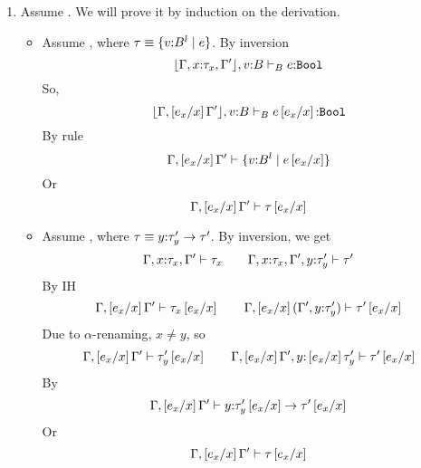 \begin{enumerate}
\item \label{proof:sub:wf}
Assume .
We will prove it by induction on the derivation.
\begin{itemize}
\item \rwbase
Assume ,
where $\tau\equiv\tref{v}{B}{l}{e}$.
By inversion
$$\hastypebase{\erase{\Gamma, x\colon\tau_x, \Gamma'},v\colon B}{e}{\tbool}$$
So,
$$\hastypebase{\erase{\Gamma, \sub{x}{e_x}\Gamma'},v\colon B}{e\sub{x}{e_x}}{\tbool}$$
By rule \rwbase
$$\iswellformed{\Gamma, \sub{x}{e_x}\Gamma'}{\tref{v}{B}{l}{e\sub{x}{e_x}}}$$
Or 
$$\iswellformed{\Gamma, \sub{x}{e_x}\Gamma'}{\tau\sub{x}{e_x}}$$
\item \rwfun
Assume ,
where $\tau\equiv \tfun{y}{\tau'_y}{\tau'}$.
By inversion, we get
$$
	\iswellformed{\Gamma, x\colon\tau_x, \Gamma'}{\tau_x} \qquad
	\iswellformed{\Gamma, x\colon\tau_x, \Gamma', y \colon \tau'_y}{\tau'}
$$
By IH
$$
	\iswellformed{\Gamma, \sub{x}{e_x} \Gamma'}{\tau_x\sub{x}{e_x}}\qquad
	\iswellformed{\Gamma, \sub{x}{e_x}(\Gamma', y \colon \tau'_y)}{\tau'\sub{x}{e_x}}
$$
Due to $\alpha$-renaming, $x \neq y$, so
$$
	\iswellformed{\Gamma, \sub{x}{e_x} \Gamma'}{\tau'_y\sub{x}{e_x}}\qquad
	\iswellformed{\Gamma, \sub{x}{e_x}\Gamma', y \colon \sub{x}{e_x}\tau'_y}{\tau'\sub{x}{e_x}}
$$
By \rwfun
$$
	\iswellformed{\Gamma, \sub{x}{e_x} \Gamma'}{\tfun{y}{\tau'_y\sub{x}{e_x}}{\tau'\sub{x}{e_x}}}
$$
Or
$$
	\iswellformed{\Gamma, \sub{x}{e_x} \Gamma'}{\tau\sub{x}{e_x}}
$$
\end{itemize}
\end{enumerate}